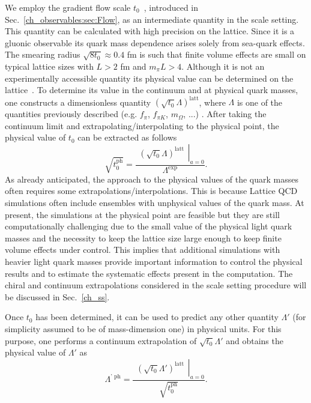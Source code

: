 We employ the gradient flow scale $t_0$~\citep{Luscher:2010we,1006.4518}, introduced in Sec.~\ref{ch_observables:sec:Flow}, as an intermediate quantity in the scale setting. This quantity can be calculated with high precision on the lattice. Since it is a gluonic observable its quark mass dependence arises solely from sea-quark effects. The smearing radius $\sqrt{8t_0} \approx 0.4$ fm  is such that finite volume effects are small on typical lattice sizes with $L > 2$ fm and $m_{\pi} L > 4$. Although it is not an experimentally accessible quantity its physical value can be determined on the lattice~\citep{Bruno:2016plf,Strassberger:2023xnj,RQCD_scale,Kostrzewa:2021syw,Hollwieser:2020qri,MILC:2015tqx}. To determine its value in the continuum and at physical quark masses, one constructs a dimensionless quantity $(\sqrt{t_0}\Lambda)^{\textrm{latt}}$, where $\Lambda$ is one of the quantities previously described (e.g. $f_{\pi}$, $f_{\pi K}$, $m_{\Omega}$, ...) . After taking the continuum limit and extrapolating/interpolating to the physical point, the physical value of $t_0$ can be extracted as follows
\begin{equation}
\label{ch_foundation:eq:Lambda}
\sqrt{t_0^{\textrm{ph}}}=\frac{\left.\begin{matrix}
\left(\sqrt{t_0}\Lambda\right)^{\textrm{latt}}
\end{matrix}\right|_{a=0}}{\Lambda^{\textrm{exp}}}.
\end{equation}
As already anticipated, the approach to the physical values of the quark masses often requires some extrapolations/interpolations. This is because Lattice QCD simulations often include ensembles with unphysical values of the quark mass. At present, the simulations at the physical point are feasible but they are still computationally challenging due to the small value of the physical light quark masses and the necessity to keep the lattice size large enough to keep finite volume effects under control. This implies that additional simulations with heavier light quark masses provide important information to control the physical results and to estimate the systematic effects present in the computation. The chiral and continuum extrapolations considered in the scale setting procedure will be discussed in Sec.~\ref{ch_ss}.

Once $t_0$ has been determined, it can be used to predict any other quantity $\Lambda'$ (for simplicity assumed to be of mass-dimension one) in physical units. For this purpose, one performs a continuum extrapolation of $\sqrt{t_0}\Lambda'$ and obtains the physical value of $\Lambda'$ as
\begin{equation}
\Lambda^{\textrm{' ph}}=\frac{\left.\begin{matrix}
\left(\sqrt{t_0}\Lambda'\right)^{\textrm{latt}}
\end{matrix}\right|_{a=0}}{\sqrt{t_0^{\textrm{ph}}}}.
\end{equation}

